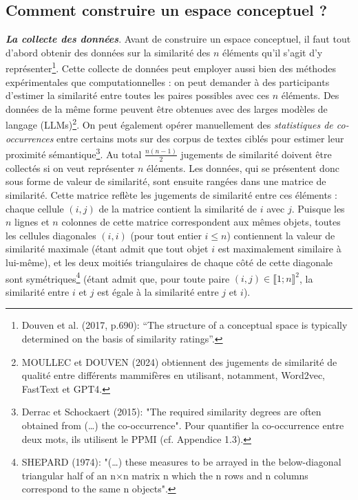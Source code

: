 \documentclass{article}
\newcommand{\bolditalic}[1]{\textbf{\textit{#1}}}
\begin{document}
\subsection*{Comment construire un espace conceptuel ?}

\bolditalic{La collecte des données}. Avant de construire un espace conceptuel, il faut tout d’abord obtenir des données sur la similarité des $n$ éléments qu’il s’agit d’y représenter\footnote{Douven et al. (2017, p.690): “The structure of a conceptual space is typically determined on the basis of similarity ratings”.}. Cette collecte de données peut employer aussi bien des méthodes expérimentales que computationnelles : on peut demander à des participants d’estimer la similarité entre toutes les paires possibles avec ces $n$ éléments. Des données de la même forme peuvent être obtenues avec des larges modèles de langage (LLMs)\footnote{MOULLEC et DOUVEN (2024) obtiennent des jugements de similarité de qualité entre différents mammifères en utilisant, notamment, Word2vec, FastText et GPT4.}. On peut également opérer manuellement des \textit{statistiques de co-occurrences} entre certains mots sur des corpus de textes ciblés  pour estimer leur proximité sémantique\footnote{Derrac et Schockaert (2015): "The required similarity degrees are often obtained from (…) the co-occurrence". Pour quantifier la co-occurrence entre deux mots, ils utilisent le PPMI (cf. Appendice 1.3).}. Au total $\frac{n(n-1)}{2}$ jugements de similarité doivent être collectés si on veut représenter $n$ éléments. Les données, qui se présentent donc sous forme de valeur de similarité, sont ensuite rangées dans une matrice de similarité. Cette matrice reflète les jugements de similarité entre ces éléments : chaque cellule $(i,j)$ de la matrice contient la similarité de $i$ avec $j$. Puisque les $n$ lignes et $n$ colonnes de cette matrice correspondent aux mêmes objets, toutes les cellules diagonales $(i,i)$ (pour tout entier \( i \leq n \)) contiennent la valeur de similarité maximale (étant admit que tout objet $i$ est maximalement similaire à lui-même), et les deux moitiés triangulaires de chaque côté de cette diagonale sont symétriques\footnote{SHEPARD (1974): "(…) these measures to be arrayed in the below-diagonal triangular half of an n×n matrix n which the n rows and n columns correspond to the same n objects".} (étant admit que, pour toute paire $(i, j) \in \llbracket 1 ; n \rrbracket^2$, la similarité entre $i$ et $j$ est égale à la similarité entre $j$ et $i$).
\end{document}
